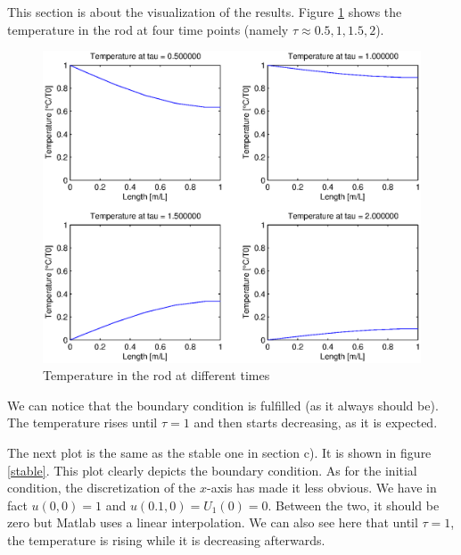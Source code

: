 This section is about the visualization of the results. Figure \ref{four} shows the temperature in the rod at four time points (namely $\tau \approx 0.5,1,1.5,2$).

\begin{figure}
\begin{center}
\includegraphics[scale=0.5]{four.eps}
\caption{Temperature in the rod at different times}
\label{four}
\end{center}
\end{figure}

We can notice that the boundary condition is fulfilled (as it always should be). The temperature rises until $\tau = 1$ and then starts decreasing, as it is expected. 

The next plot is the same as the stable one in section c). It is shown in figure \ref{stable}. This plot clearly depicts the boundary condition. As for the initial condition, the discretization of the $x$-axis has made it less obvious. We have in fact $u(0,0)=1$ and $u(0.1,0) = U_1(0) = 0$. Between the two, it should be zero but Matlab uses a linear interpolation. We can also see here that until $\tau=1$, the temperature is rising while it is decreasing afterwards.

